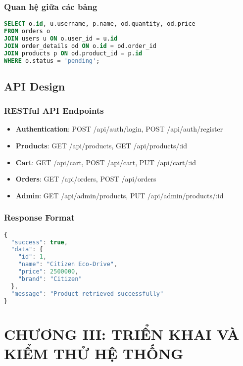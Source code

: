 \subsection{Quan hệ giữa các bảng}
\begin{lstlisting}[language=SQL, title={Ví dụ query quan hệ}]
SELECT o.id, u.username, p.name, od.quantity, od.price
FROM orders o
JOIN users u ON o.user_id = u.id
JOIN order_details od ON o.id = od.order_id
JOIN products p ON od.product_id = p.id
WHERE o.status = 'pending';
\end{lstlisting}

\section{API Design}

\subsection{RESTful API Endpoints}
\begin{itemize}
    \item \textbf{Authentication}: POST /api/auth/login, POST /api/auth/register
    \item \textbf{Products}: GET /api/products, GET /api/products/:id
    \item \textbf{Cart}: GET /api/cart, POST /api/cart, PUT /api/cart/:id
    \item \textbf{Orders}: GET /api/orders, POST /api/orders
    \item \textbf{Admin}: GET /api/admin/products, PUT /api/admin/products/:id
\end{itemize}

\subsection{Response Format}
\begin{lstlisting}[language=JavaScript, title={API Response Structure}]
{
  "success": true,
  "data": {
    "id": 1,
    "name": "Citizen Eco-Drive",
    "price": 2500000,
    "brand": "Citizen"
  },
  "message": "Product retrieved successfully"
}
\end{lstlisting}

\setcounter{chapter}{3} 
\chapter*{CHƯƠNG III: TRIỂN KHAI VÀ KIỂM THỬ HỆ THỐNG}

